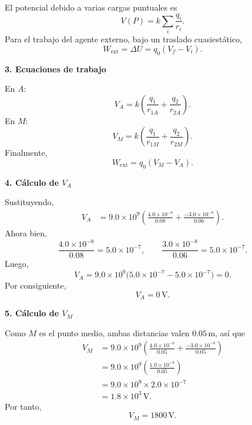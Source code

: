 \documentclass[11pt]{article}
\begin{document}
El potencial debido a varias cargas puntuales es
\begin{equation*}
    V(P)=k\sum_i \frac{q_i}{r_i}.
\end{equation*}
Para el trabajo del agente externo, bajo un traslado cuasiest\'atico,
\begin{equation*}
    W_{\text{ext}}=\Delta U=q_0(V_f-V_i).
\end{equation*}

\textbf{3. Ecuaciones de trabajo}

En $A$:
\begin{equation*}
    V_A=k\left(\frac{q_1}{r_{1A}}+\frac{q_2}{r_{2A}}\right).
\end{equation*}
En $M$:
\begin{equation*}
    V_M=k\left(\frac{q_1}{r_{1M}}+\frac{q_2}{r_{2M}}\right).
\end{equation*}
Finalmente,
\begin{equation*}
    W_{\text{ext}}=q_0(V_M-V_A).
\end{equation*}

\textbf{4. C\'alculo de $V_A$}

Sustituyendo,
\begin{align*}
    V_A
    &=9.0\times 10^9\left(\frac{4.0\times 10^{-8}}{0.08}+\frac{-3.0\times 10^{-8}}{0.06}\right).
\end{align*}
Ahora bien,
\begin{equation*}
    \frac{4.0\times 10^{-8}}{0.08}=5.0\times 10^{-7},
    \qquad
    \frac{3.0\times 10^{-8}}{0.06}=5.0\times 10^{-7}.
\end{equation*}
Luego,
\begin{equation*}
    V_A=9.0\times 10^9\big(5.0\times 10^{-7}-5.0\times 10^{-7}\big)=0.
\end{equation*}
Por consiguiente,
\begin{equation*}
    \boxed{V_A=0\,\text{V}}.
\end{equation*}

\textbf{5. C\'alculo de $V_M$}

Como $M$ es el punto medio, ambas distancias valen $0.05\,\text{m}$, as\'i que
\begin{align*}
    V_M
    &=9.0\times 10^9\left(\frac{4.0\times 10^{-8}}{0.05}+\frac{-3.0\times 10^{-8}}{0.05}\right)\\
    &=9.0\times 10^9\left(\frac{1.0\times 10^{-8}}{0.05}\right)\\
    &=9.0\times 10^9\times 2.0\times 10^{-7}\\
    &=1.8\times 10^3\,\text{V}.
\end{align*}
Por tanto,
\begin{equation*}
    \boxed{V_M=1800\,\text{V}}.
\end{equation*}
\end{document}
